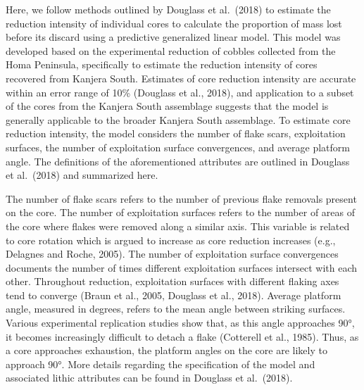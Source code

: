 \documentclass[]{elsarticle} %
\begin{document}
Here, we follow methods outlined by \hspace{0pt}Douglass et
al.~(2018)\hspace{0pt} to estimate the reduction intensity of individual
cores to calculate the proportion of mass lost before its discard using
a predictive generalized linear model. This model was developed based on
the experimental reduction of cobbles collected from the Homa Peninsula,
specifically to estimate the reduction intensity of cores recovered from
Kanjera South. Estimates of core reduction intensity are accurate within
an error range of 10\% (\hspace{0pt}Douglass et al., 2018\hspace{0pt}),
and application to a subset of the cores from the Kanjera South
assemblage suggests that the model is generally applicable to the
broader Kanjera South assemblage. To estimate core reduction intensity,
the model considers the number of flake scars, exploitation surfaces,
the number of exploitation surface convergences, and average platform
angle. The definitions of the aforementioned attributes are outlined in
\hspace{0pt}Douglass et al.~(2018)\hspace{0pt} and summarized here.

The number of flake scars refers to the number of previous flake
removals present on the core. The number of exploitation surfaces refers
to the number of areas of the core where flakes were removed along a
similar axis. This variable is related to core rotation which is argued
to increase as core reduction increases (e.g., \hspace{0pt}Delagnes and
Roche, 2005\hspace{0pt}). The number of exploitation surface
convergences documents the number of times different exploitation
surfaces intersect with each other. Throughout reduction, exploitation
surfaces with different flaking axes tend to converge (\hspace{0pt}Braun
et al., 2005\hspace{0pt}, \hspace{0pt}Douglass et al.,
2018\hspace{0pt}). Average platform angle, measured in degrees, refers
to the mean angle between striking surfaces. Various experimental
replication studies show that, as this angle approaches 90°, it becomes
increasingly difficult to detach a flake (\hspace{0pt}Cotterell et al.,
1985\hspace{0pt}). Thus, as a core approaches exhaustion, the platform
angles on the core are likely to approach 90°. More details regarding
the specification of the model and associated lithic attributes can be
found in \hspace{0pt}Douglass et al.~(2018)\hspace{0pt}.
\end{document}
